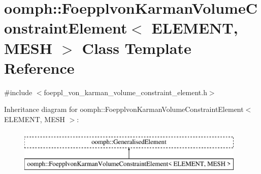 \hypertarget{classoomph_1_1FoepplvonKarmanVolumeConstraintElement}{}\section{oomph\+:\+:Foepplvon\+Karman\+Volume\+Constraint\+Element$<$ E\+L\+E\+M\+E\+NT, M\+E\+SH $>$ Class Template Reference}
\label{classoomph_1_1FoepplvonKarmanVolumeConstraintElement}


{\ttfamily \#include $<$foeppl\+\_\+von\+\_\+karman\+\_\+volume\+\_\+constraint\+\_\+element.\+h$>$}

Inheritance diagram for oomph\+:\+:Foepplvon\+Karman\+Volume\+Constraint\+Element$<$ E\+L\+E\+M\+E\+NT, M\+E\+SH $>$\+:\begin{figure}[H]
\begin{center}
\leavevmode
\includegraphics[height=2.000000cm]{classoomph_1_1FoepplvonKarmanVolumeConstraintElement}
\end{center}
\end{figure}
